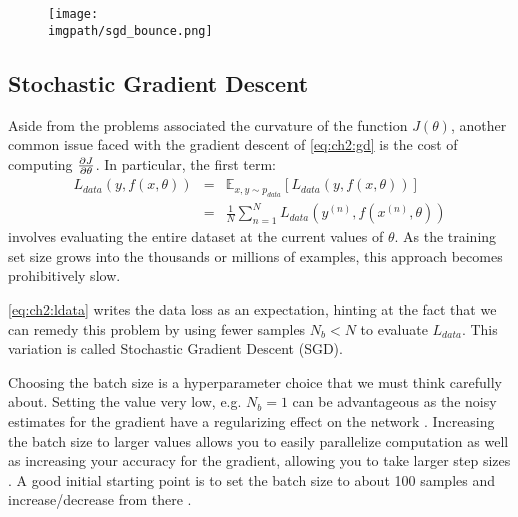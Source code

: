   \begin{figure}[t]
  \centering
  \texttt{[image: \\imgpath/sgd\_bounce.png]}
  \label{fig:ch2:gd_bounce}
\end{figure}

\subsection{Stochastic Gradient Descent}
Aside from the problems associated the curvature of the function $J(\theta)$,
another common issue faced with the gradient descent of \eqref{eq:ch2:gd} is the
cost of computing $\frac{\partial J}{\partial \theta}$. In particular, the first term:
\begin{eqnarray}\label{eq:ch2:ldata}
  L_{data}(y, f(x, \theta)) &=& \mathbb{E}_{x,y \sim p_{data}}\left[ L_{data}(y, f(x, \theta))\right] \\
&=& \frac{1}{N}\sum_{n=1}^N L_{data}\left(y^{(n)}, f(x^{(n)}, \theta)\right) 
\end{eqnarray}
involves evaluating the entire dataset at the current values of $\theta$. As the
training set size grows into the thousands or millions of examples, this
approach becomes prohibitively slow. 

\eqref{eq:ch2:ldata} writes the data loss as an expectation, hinting at the fact that 
we can remedy this problem by using fewer samples $N_b < N$ to evaluate $L_{data}$. 
This variation is called Stochastic Gradient Descent (SGD).

Choosing the batch size is a hyperparameter choice that we must think carefully
about. Setting the value very low, e.g. $N_b = 1$ can be advantageous as the
noisy estimates for the gradient have a regularizing effect on the network
\cite{wilson_general_2003}. Increasing the batch size to larger values allows
you to easily parallelize computation as well as increasing your accuracy for
the gradient, allowing you to take larger step sizes \cite{smith_dont_2017}.
A good initial starting point is to set the batch size to about 100 samples and
increase/decrease from there \cite{goodfellow_deep_2016}.

